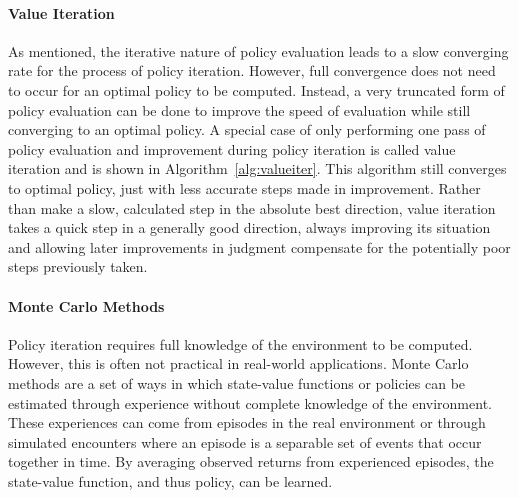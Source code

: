 

\paragraph*{Value Iteration}

As mentioned,
the iterative nature of policy evaluation leads to a slow converging rate
for the process of policy iteration.
%
However,
full convergence does not need to occur for an optimal policy to be computed.
%
Instead,
a very truncated form of policy evaluation can be done to improve the speed
of evaluation while still converging to an optimal policy.
%
A special case of only performing one pass of policy evaluation and improvement
during policy iteration is called value iteration
and is shown in Algorithm~\ref{alg:valueiter}. 
%
This algorithm still converges to optimal policy,
just with less accurate steps made in improvement.
%
Rather than make a slow, calculated step in the absolute best direction,
value iteration takes a quick step in a generally good direction,
always improving its situation and
allowing later improvements in judgment compensate for the potentially poor
steps previously taken.



\paragraph*{Monte Carlo Methods}


Policy iteration requires full knowledge of the environment to be computed.
%
However,
this is often not practical in real-world applications.
%
Monte Carlo methods are a set of ways in which
state-value functions or policies can be estimated through experience without
complete knowledge of the environment.
%
These experiences can come from episodes in the real environment
or through simulated encounters
where an episode is a separable set of events that occur together in
time.
%
By averaging observed returns from experienced episodes,
the state-value function,
and thus policy,
can be learned.

